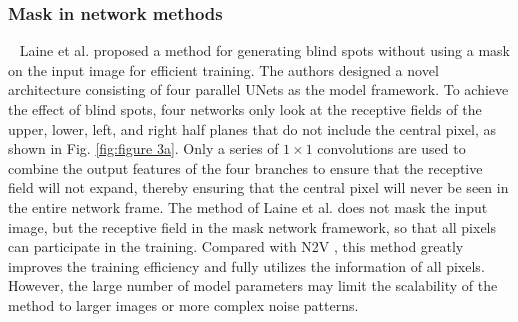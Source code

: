 \documentclass[conference]{IEEEtran}
\begin{document}
\subsubsection{Mask in network methods}
\
\newline
\noindent Laine et al. \cite{laine2019high} proposed a method for generating blind spots without using a mask on the input image for efficient training. The authors designed a novel architecture consisting of four parallel UNets\cite{ko2018pac} as the model framework. To achieve the effect of blind spots, four networks only look at the receptive fields of the upper, lower, left, and right half planes that do not include the central pixel, as shown in Fig. \ref{fig:figure 3a}.  Only a series of $1\times1$ convolutions are used to combine the output features of the four branches to ensure that the receptive field will not expand, thereby ensuring that the central pixel will never be seen in the entire network frame. The method of Laine et al. does not mask the input image, but the receptive field in the mask network framework, so that all pixels can participate in the training. Compared with N2V \cite{krull2019noise2void}, this method greatly improves the training efficiency and fully utilizes the information of all pixels. However, the large number of model parameters may limit the scalability of the method to larger images or more complex noise patterns.
\end{document}
